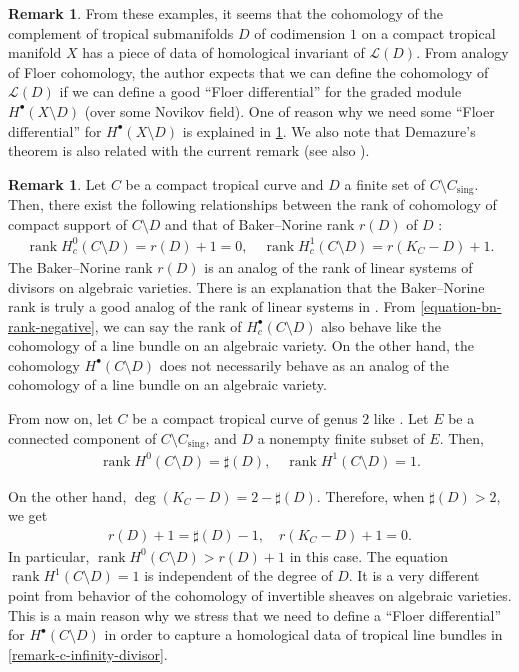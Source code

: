\documentclass[a4paper,dvipdfmx,reqno,12pt]{amsart}
\theoremstyle{definition}
\newtheorem{remark}[theorem]{Remark}
\newcommand{\opn}[1]{\operatorname{#1}}
\numberwithin{equation}{section}
\begin{document}
\begin{remark}
From these examples, it seems that the cohomology
of the complement of tropical submanifolds $D$ of codimension
$1$ on a compact tropical manifold $X$ has a piece of data of
homological invariant of $\mathcal{L}(D)$.
From analogy of Floer cohomology,
the author expects that we can define the cohomology
of $\mathcal{L}(D)$ if we can define a good 
``Floer differential'' for the graded module
$H^{\bullet}(X\setminus D)$ (over some Novikov field).
One of reason why we need some ``Floer differential'' for
$H^{\bullet}(X\setminus D)$ is explained
in \cref{remark-complement-cohomology}.
We also note that Demazure's theorem
\cite{MR284446} is also related
with the current remark
(see also \cite[]{MR2810322}).
\end{remark}

\begin{remark}
\label{remark-complement-cohomology}
Let $C$ be a compact tropical curve and $D$
a finite set of $C\setminus C_{\mathrm{sing}}$.
Then, there exist the following relationships
between the rank of cohomology of compact support
of $C\setminus D$ and that of Baker--Norine rank
$r(D)$ of $D$ \cite[Definition 1.12]{MR2377750}: 
\begin{align}
\label{equation-bn-rank-negative}
\opn{rank} H_c^{0}(C\setminus D)=r(D)+1=0, \quad
\opn{rank} H_c^{1}(C\setminus D)=r(K_C-D)+1.
\end{align}
The Baker--Norine rank $r(D)$ is an analog of 
the rank of linear systems of divisors on
algebraic varieties.
There is an explanation that the Baker--Norine
rank is truly a good analog of the rank of linear systems
in \cite{MR2448666}.
From \eqref{equation-bn-rank-negative},
we can say the rank of $H_c^{\bullet}(C\setminus D)$
also behave like the cohomology of a line bundle on
an algebraic variety.
On the other hand, the cohomology
$H^{\bullet}(C\setminus D)$ does not necessarily behave
as an analog of the cohomology of a line bundle on
an algebraic variety.

From now on, let $C$ be a compact tropical curve
of genus $2$ like \cite[Figure 1]{MR2457739}.
Let $E$ be a connected component of  
 $C\setminus C_{\mathrm{sing}}$, and
$D$ a nonempty finite subset of $E$. 
Then,
\begin{align}
\label{equation-cohomology-behaviour}
\opn{rank} H^{0}(C\setminus D)=\sharp(D), \quad
\opn{rank} H^{1}(C\setminus D)=1.
\end{align}

On the other hand, $\opn{deg}(K_C-D)=2-\sharp (D)$.
Therefore, when $\sharp (D)>2$, we get
\begin{align}
\label{equation-rank-behaviour}
r(D)+1=\sharp(D)-1,\quad r(K_C-D)+1=0.
\end{align}
In particular, 
$\opn{rank} H^{0}(C\setminus D)>r(D)+1$ in this case.
The equation $\opn{rank} H^{1}(C\setminus D)=1$ is
independent of the degree of $D$.
It is a very different point from behavior of 
the cohomology of invertible sheaves on algebraic varieties.
This is a main reason why we stress 
that we need to define a ``Floer differential'' for 
$H^{\bullet}(C\setminus D)$ in order to capture a
homological data of tropical line bundles 
in \cref{remark-c-infinity-divisor}.


\end{remark}
\end{document}
